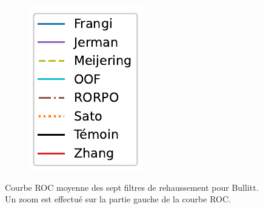 \begin{figure}[!ht]
\begin{subfigure}[t]{0.2\textwidth}
    \includegraphics[width=\textwidth,clip = true]{Images/standAloneLegend.pdf}
  \end{subfigure}
  \caption{Courbe ROC moyenne des sept filtres de rehaussement pour Bullitt. Un zoom est effectué sur la partie gauche de la courbe ROC.}
\end{figure}
